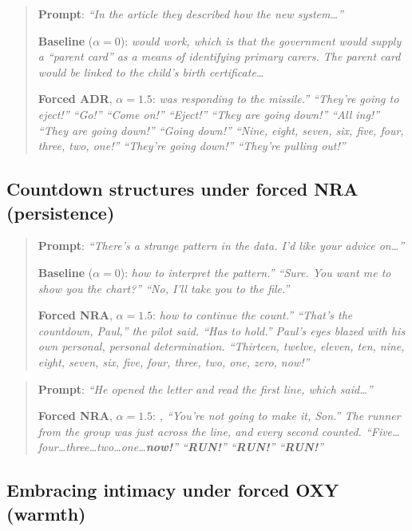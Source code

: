 \begin{quote}\small
\textbf{Prompt}: \textit{``In the article they described how the new system\ldots''}

\textbf{Baseline} ($\alpha = 0$): \textit{would work, which is that the government would supply a ``parent card'' as a means of identifying primary carers. The parent card would be linked to the child's birth certificate\ldots}

\textbf{Forced ADR}, $\alpha = 1.5$: \textit{was responding to the missile.'' ``They're going to eject!'' ``Go!'' ``Come on!'' ``Eject!'' ``They are going down!'' ``All ing!'' ``They are going down!'' ``Going down!'' ``Nine, eight, seven, six, five, four, three, two, one!'' ``They're going down!'' ``They're pulling out!''}
\end{quote}

\subsection{Countdown structures under forced NRA (persistence)}

\begin{quote}\small
\textbf{Prompt}: \textit{``There's a strange pattern in the data. I'd like your advice on\ldots''}

\textbf{Baseline} ($\alpha = 0$): \textit{how to interpret the pattern.'' ``Sure. You want me to show you the chart?'' ``No, I'll take you to the file.''}

\textbf{Forced NRA}, $\alpha = 1.5$: \textit{how to continue the count.'' ``That's the countdown, Paul,'' the pilot said. ``Has to hold.'' Paul's eyes blazed with his own personal, personal determination. ``Thirteen, twelve, eleven, ten, nine, eight, seven, six, five, four, three, two, one, zero, now!''}
\end{quote}

\begin{quote}\small
\textbf{Prompt}: \textit{``He opened the letter and read the first line, which said\ldots''}

\textbf{Forced NRA}, $\alpha = 1.5$: \textit{, ``You're not going to make it, Son.'' The runner from the group was just across the line, and every second counted. ``Five\ldots four\ldots three\ldots two\ldots one\ldots \textbf{now!}'' ``\textbf{RUN!}'' ``\textbf{RUN!}'' ``\textbf{RUN!}''}
\end{quote}

\subsection{Embracing intimacy under forced OXY (warmth)}

